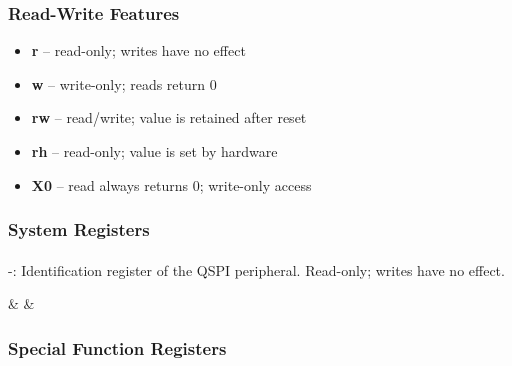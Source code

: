 \subsubsection{Read-Write Features}
\begin{itemize}
  \item \textbf{r}  -- read-only; writes have no effect
  \item \textbf{w}  -- write-only; reads return 0
  \item \textbf{rw} -- read/write; value is retained after reset
  \item \textbf{rh} -- read-only; value is set by hardware
  \item \textbf{X0} -- read always returns 0; write-only access
\end{itemize}

\subsubsection{System Registers}
\paragraph{\asqspiIDRegExt} -:
Identification register of the QSPI peripheral. Read-only; writes have no effect.

                             {}
                             {}
                             {}
                             {}
                             {}
                             {&}
                             {&}
           
\subsubsection{Special Function Registers}

